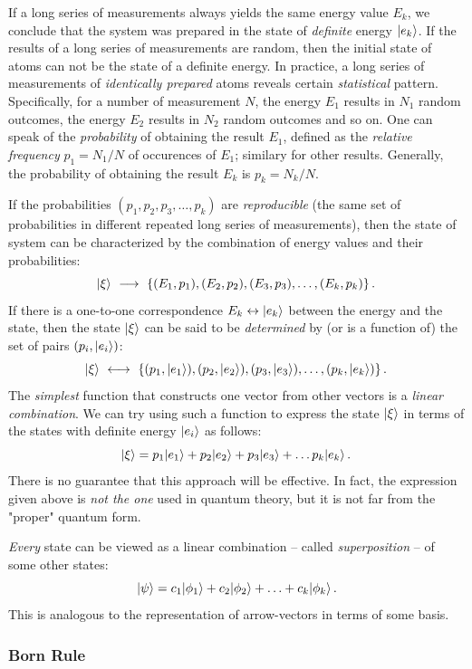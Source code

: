 If a long series of measurements always yields the same energy value $E_k$, we conclude that the system was prepared in the state of \emph{definite} energy $|{e_k}\rangle$. If the results of a long series of measurements are random, then the initial state of atoms can not be the state of a definite energy. In practice, a long series of measurements of \emph{identically prepared} atoms reveals certain \emph{statistical} pattern. Specifically, for a number of measurement $N$, the energy $E_1$ results in $N_1$ random outcomes, the energy $E_2$ results in $N_2$ random outcomes and so on. One can speak of the \emph{probability} of obtaining the result $E_1$, defined as the \emph{relative frequency} $p_1=N_1/N$ of occurences of $E_1$; similary for other results. Generally, the probability of obtaining the result $E_k$ is $p_k=N_k/N$. 

If the probabilities $(p_1, p_2, p_3,\ldots, p_k)$ are
 \emph{reproducible} (the same set of probabilities in different repeated long series of measurements), then the state of system can be characterized by the combination of energy values and their probabilities:
 \[
 |{\xi}\rangle\,\,\longrightarrow\,\, \lbrace(E_1, p_1), (E_2, p_2), (E_3, p_3), \ldots, (E_k, p_k)\rbrace\,.
 \]
If there is a one-to-one correspondence $E_k\leftrightarrow|{e_k}\rangle$ between the energy and the state, then the state $|{\xi}\rangle$ can be said to be \emph{determined} by (or is a function of) the set of pairs $(p_i,|{e_i}\rangle)$:
\[
|{\xi}\rangle\,\,\longleftrightarrow\,\, \lbrace(p_1, |{e_1}\rangle), (p_2, |{e_2}\rangle), (p_3, |{e_3}\rangle), \ldots, (p_k, |{e_k}\rangle)\rbrace\,.
\]
The \emph{simplest} function that constructs one vector from other vectors is a \emph{linear combination}. We can try using such a function to express the state $|{\xi}\rangle$ in terms of the states with definite energy $|{e_i}\rangle$ as follows:
\[
|{\xi}\rangle = p_1|{e_1}\rangle+p_2|{e_2}\rangle+p_3|{e_3}\rangle+\ldots p_k|{e_k}\rangle\,.
\]
There is no guarantee that this approach will be effective. In fact, the expression given above is \emph{not the one} used in quantum theory, but it is not far from the "proper" quantum form.

\emph{Every} state can be viewed as a linear combination -- called \emph{superposition} -- of some other states:
\[
|{\psi}\rangle = c_1|{\phi_1}\rangle+c_2|{\phi_2}\rangle+\ldots+c_k|{\phi_k}\rangle\,.
\]
This is analogous to the representation of arrow-vectors in terms of some basis. 

\subsubsection*{Born Rule}


